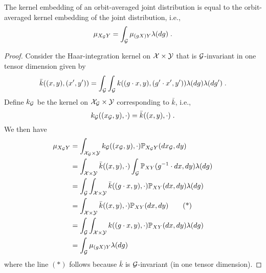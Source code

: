 \begin{proposition} \label{prop:embed}
The kernel embedding of an orbit-averaged joint distribution is equal to the orbit-averaged kernel embedding of the joint distribution, i.e.,
\[
\mu_{X_{\mathcal{G}} Y} = \int_{\mathcal{G}} \mu_{(gX)Y}\lambda(dg)\;.
\]
\end{proposition}
\begin{proof}
Consider the Haar-integration kernel \parencite{Haasdonk:2005} on $\mathcal{X}\times\mathcal{Y}$ that is $\mathcal{G}$-invariant in one tensor dimension given by
\[
\bar{k}((x,y),(x',y'))=\int_{\mathcal{G}}\int_{\mathcal{G}} k((g\cdot x,y), (g'\cdot x',y'))\lambda(dg)\lambda(dg')\;.
\]
Define $k_{\mathcal{G}}$ be the kernel on $\mathcal{X}_{\mathcal{G}}\times\mathcal{Y}$ corresponding to $\bar{k}$, i.e.,
\[
k_{\mathcal{G}}((x_{\mathcal{G}},y),\cdot) = \bar{k}((x,y),\cdot) \;.
\]
We then have
\begin{align*}
\mu_{X_{\mathcal{G}} Y} &= \int_{\mathcal{X}_{\mathcal{G}}\times\mathcal{Y}}k_{\mathcal{G}}((x_{\mathcal{G}}, y),\cdot)\mathbb{P}_{X_{\mathcal{G}} Y}(dx_{\mathcal{G}},dy) \\
&= \int_{\mathcal{X}\times\mathcal{Y}}\bar{k}((x,y),\cdot)\int_{\mathcal{G}}\mathbb{P}_{XY}(g^{-1}\cdot dx,dy)\lambda(dg) \\
&= \int_{\mathcal{G}}\int_{\mathcal{X}\times\mathcal{Y}}\bar{k}((g\cdot x, y),\cdot)\mathbb{P}_{XY}(dx,dy)\lambda(dg) \\
&= \int_{\mathcal{X}\times\mathcal{Y}}\bar{k}((x,y),\cdot)\mathbb{P}_{XY}(dx,dy) \tag{*} \\
&= \int_{\mathcal{G}}\int_{\mathcal{X}\times\mathcal{Y}}k((g\cdot x, y),\cdot)\mathbb{P}_{XY}(dx,dy)\lambda(dg) \\
&= \int_{\mathcal{G}}\mu_{(gX)Y}\lambda(dg)
\end{align*}
where the line $(*)$ follows because $\bar{k}$ is $\mathcal{G}$-invariant (in one tensor dimension).
\end{proof}

